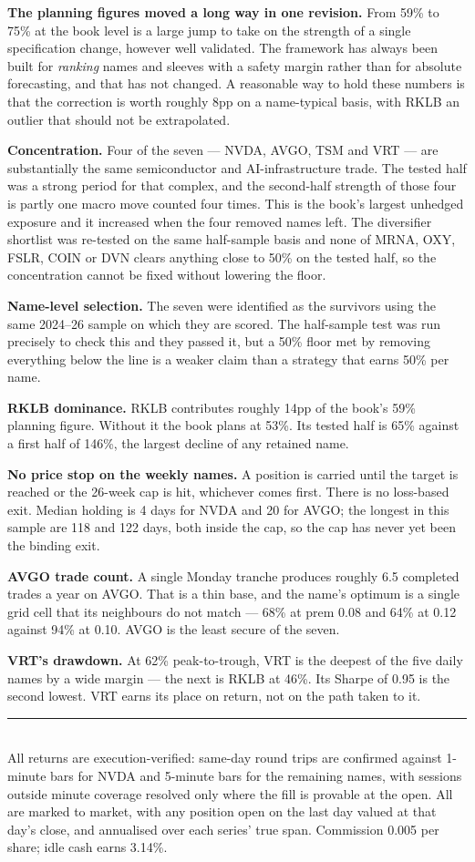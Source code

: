 \documentclass[11pt]{article}
\begin{document}
\textbf{The planning figures moved a long way in one revision.} From 59\% to 75\% at the book
level is a large jump to take on the strength of a single specification change, however well
validated. The framework has always been built for \emph{ranking} names and sleeves with a safety
margin rather than for absolute forecasting, and that has not changed. A reasonable way to hold
these numbers is that the correction is worth roughly 8pp on a name-typical basis, with RKLB an
outlier that should not be extrapolated.

\textbf{Concentration.} Four of the seven --- NVDA, AVGO, TSM and VRT --- are substantially the
same semiconductor and AI-infrastructure trade. The tested half was a strong period for that
complex, and the second-half strength of those four is partly one macro move counted four times.
This is the book's largest unhedged exposure and it increased when the four removed names left.
The diversifier shortlist was re-tested on the same half-sample basis and none of MRNA, OXY, FSLR,
COIN or DVN clears anything close to 50\% on the tested half, so the concentration cannot be fixed
without lowering the floor.

\textbf{Name-level selection.} The seven were identified as the survivors using the same 2024--26
sample on which they are scored. The half-sample test was run precisely to check this and they
passed it, but a 50\% floor met by removing everything below the line is a weaker claim than a
strategy that earns 50\% per name.

\textbf{RKLB dominance.} RKLB contributes roughly 14pp of the book's 59\% planning figure. Without
it the book plans at 53\%. Its tested half is 65\% against a first half of 146\%, the largest
decline of any retained name.

\textbf{No price stop on the weekly names.} A position is carried until the target is reached or
the 26-week cap is hit, whichever comes first. There is no loss-based exit. Median holding is 4
days for NVDA and 20 for AVGO; the longest in this sample are 118 and 122 days, both inside the
cap, so the cap has never yet been the binding exit.

\textbf{AVGO trade count.} A single Monday tranche produces roughly 6.5 completed trades a year on
AVGO. That is a thin base, and the name's optimum is a single grid cell that its neighbours do not
match --- 68\% at prem 0.08 and 64\% at 0.12 against 94\% at 0.10. AVGO is the least secure of the
seven.

\textbf{VRT's drawdown.} At 62\% peak-to-trough, VRT is the deepest of the five daily names by a
wide margin --- the next is RKLB at 46\%. Its Sharpe of 0.95 is the second lowest. VRT earns its
place on return, not on the path taken to it.

\vfill
{\color{bcrule}\rule{\textwidth}{0.6pt}}\\[0.2em]
{\footnotesize\color{bcgrey} All returns are execution-verified: same-day round trips are
confirmed against 1-minute bars for NVDA and 5-minute bars for the remaining names, with sessions
outside minute coverage resolved only where the fill is provable at the open. All are marked to
market, with any position open on the last day valued at that day's close, and annualised over
each series' true span. Commission 0.005 per share; idle cash earns 3.14\%.}
\end{document}
